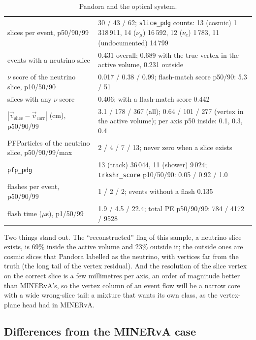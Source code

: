 \documentclass[10pt,letterpaper]{article}
\newcommand{\code}[1]{\texttt{#1}}
\newcommand{\pct}[1]{#1\%}
\begin{document}
\begin{table}[H]\centering\small
\caption{Pandora and the optical system.}\label{tab:pandora}
\begin{tabular}{@{}>{\raggedright\arraybackslash}p{52mm}p{108mm}@{}}\toprule
slices per event, p50/90/99 & 30 / 43 / 62; \code{slice\_pdg} counts: 13 (cosmic) 1\,318\,911, 14 ($\nu_\mu$) 16\,592, 12 ($\nu_e$) 1\,783, 11 (undocumented) 14\,799\\
events with a neutrino slice & 0.431 overall; 0.689 with the true vertex in the active volume, 0.231 outside\\
$\nu$ score of the neutrino slice, p10/50/90 & 0.017 / 0.38 / 0.99; flash-match score p50/90: 5.3 / 51\\
slices with any $\nu$ score & 0.406; with a flash-match score 0.442\\
$|\vec v_\text{slice}-\vec v_\text{corr}|$ (cm), p50/90/99 & 3.1 / 178 / 367 (all); 0.64 / 101 / 277 (vertex in the active volume); per axis p50 inside: 0.1, 0.3, 0.4\\
PFParticles of the neutrino slice, p50/90/99/max & 2 / 4 / 7 / 13; never zero when a slice exists\\
\code{pfp\_pdg} & 13 (track) 36\,044, 11 (shower) 9\,024; \code{trkshr\_score} p10/50/90: 0.05 / 0.92 / 1.0\\
flashes per event, p50/90/99 & 1 / 2 / 2; events without a flash 0.135\\
flash time ($\mu$s), p1/50/99 & 1.9 / 4.5 / 22.4; total PE p50/90/99: 784 / 4172 / 9528\\
\bottomrule\end{tabular}
\end{table}

Two things stand out. The ``reconstructed'' flag of this sample, a neutrino slice exists, is \pct{69} inside the active
volume and \pct{23} outside it; the outside ones are cosmic slices that Pandora labelled as the neutrino, with vertices
far from the truth (the long tail of the vertex residual). And the resolution of the slice vertex on the correct slice
is a few millimetres per axis, an order of magnitude better than MINERvA's, so the vertex column of an event flow will
be a narrow core with a wide wrong-slice tail: a mixture that wants its own class, as the vertex-plane head had in
MINERvA.

\subsection{Differences from the MINERvA case}\label{sec:diff}
\end{document}
